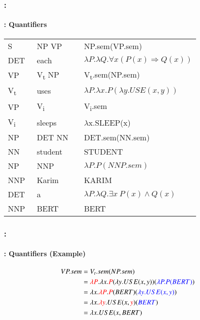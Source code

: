 \documentclass[xcolor=table]{beamer}
\begin{document}
\begin{frame}
	\frametitle{\insertshortsubtitle: \insertsection}
	\framesubtitle{\insertsubsection: Quantifiers}
	
	\begin{center}
		\small
		\begin{tabular}{llll}
			\hline\hline
			S  & \textrightarrow\ NP VP && NP.sem(VP.sem) \\
			DET & \textrightarrow\ each && $\lambda P.\lambda Q.\forall x (P(x) \Rightarrow Q(x))$ \\
			
			VP & \textrightarrow\ V\textsubscript{t} NP && V\textsubscript{t}.sem(NP.sem) \\
			V\textsubscript{t}  & \textrightarrow\ uses && $\lambda P.\lambda x.P(\lambda y.USE(x, y))$ \\
			
			VP & \textrightarrow\ V\textsubscript{i} && V\textsubscript{i}.sem \\
			V\textsubscript{i}  & \textrightarrow\ sleeps && $ \lambda $x.SLEEP(x) \\
			
			NP & \textrightarrow\ DET NN && DET.sem(NN.sem) \\
			NN  & \textrightarrow\  student && STUDENT \\
			
			NP & \textrightarrow\ NNP && $\lambda P.P(NNP.sem)$ \\
			NNP  & \textrightarrow\  Karim && KARIM \\
			
			DET & \textrightarrow\ a && $\lambda P.\lambda Q.\exists x\ P(x) \wedge Q(x)$ \\
			NNP  & \textrightarrow\  BERT && BERT \\
			\hline\hline
		\end{tabular}
	\end{center}
	
\end{frame}

\begin{frame}
	\frametitle{\insertshortsubtitle: \insertsection}
	\framesubtitle{\insertsubsection: Quantifiers (Example)}
	
	\begin{center}
		\small
		\begin{align*}
			VP.sem & = V_t.sem(NP.sem) \\
			& = \textcolor{red}{\lambda P}.\lambda x.\textcolor{red}{P}(\lambda y.USE(x, y))(\textcolor{blue}{\lambda P.P(BERT)}) \\
			& = \lambda x.\textcolor{red}{\lambda P}.\textcolor{red}{P}(BERT)(\textcolor{blue}{\lambda y.USE(x, y)}) \\
			& = \lambda x.\textcolor{red}{\lambda y}.USE(x, \textcolor{red}{y})(\textcolor{blue}{BERT}) \\
			& = \lambda x.USE(x, BERT) \\
		\end{align*}
	\end{center}
	
\end{frame}
\end{document}
